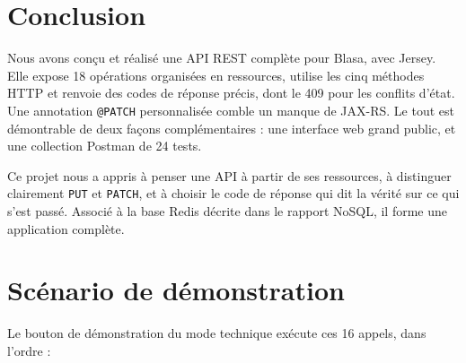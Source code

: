 \documentclass[11pt,a4paper]{article}
\begin{document}
\section{Conclusion}
Nous avons con\c cu et r\'ealis\'e une API REST compl\`ete pour Blasa, avec Jersey. Elle expose 18 op\'erations organis\'ees en ressources, utilise les cinq m\'ethodes HTTP et renvoie des codes de r\'eponse pr\'ecis, dont le 409 pour les conflits d'\'etat. Une annotation \texttt{@PATCH} personnalis\'ee comble un manque de JAX-RS. Le tout est d\'emontrable de deux fa\c cons compl\'ementaires : une interface web grand public, et une collection Postman de 24 tests.

Ce projet nous a appris \`a penser une API \`a partir de ses ressources, \`a distinguer clairement \texttt{PUT} et \texttt{PATCH}, et \`a choisir le code de r\'eponse qui dit la v\'erit\'e sur ce qui s'est pass\'e. Associ\'e \`a la base Redis d\'ecrite dans le rapport NoSQL, il forme une application compl\`ete.

\appendix
\section{Sc\'enario de d\'emonstration}\label{app:scenario}
Le bouton de d\'emonstration du mode technique ex\'ecute ces 16 appels, dans l'ordre :
\end{document}
